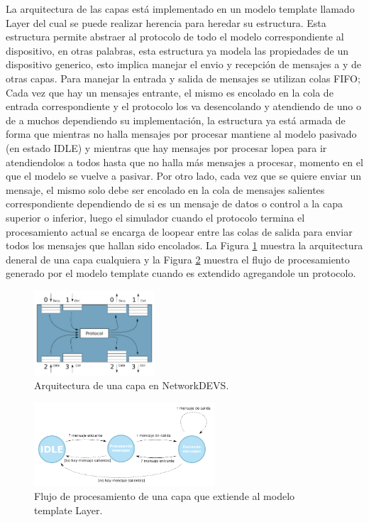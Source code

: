 \documentclass[10pt,a4paper]{article}
\begin{document}
La arquitectura de las capas está implementado en un modelo template llamado Layer del cual se puede realizar herencia para heredar su estructura. Esta estructura permite abstraer al protocolo de todo el modelo correspondiente al dispositivo, en otras palabras, esta estructura ya modela las propiedades de un dispositivo generico, esto implica manejar el envio y recepción de mensajes a y de otras capas. Para manejar la entrada y salida de mensajes se utilizan colas FIFO; Cada vez que hay un mensajes entrante, el mismo es encolado en la cola de entrada correspondiente y el protocolo los va desencolando y atendiendo de uno o de a muchos dependiendo su implementación, la estructura ya está armada de forma que mientras no halla mensajes por procesar mantiene al modelo pasivado (en estado IDLE) y mientras que hay mensajes por procesar lopea para ir atendiendolos a todos hasta que no halla más mensajes a procesar, momento en el que el modelo se vuelve a pasivar. Por otro lado, cada vez que se quiere enviar un mensaje, el mismo solo debe ser encolado en la cola de mensajes salientes correspondiente dependiendo de si es un mensaje de datos o control a la capa superior o inferior, luego el simulador cuando el protocolo termina el procesamiento actual se encarga de loopear entre las colas de salida para enviar todos los mensajes que hallan sido encolados. La Figura \ref{figure:layer general architecture} muestra la arquitectura deneral de una capa cualquiera y la Figura \ref{figure:processing flow} muestra el flujo de procesamiento generado por el modelo template cuando es extendido agregandole un protocolo.

\begin{figure}[htbp]
    \centering
    \includegraphics[width = 0.4\textwidth]{img/png/layer_architecture.png}
    \caption{Arquitectura de una capa en NetworkDEVS.}
    \label{figure:layer general architecture}
\end{figure}

\begin{figure}[htbp]
    \centering
    \includegraphics[width = 0.6\textwidth]{img/png/processing_flow.png}
    \caption{Flujo de procesamiento de una capa que extiende al modelo template Layer.}
    \label{figure:processing flow}
\end{figure}
\end{document}
